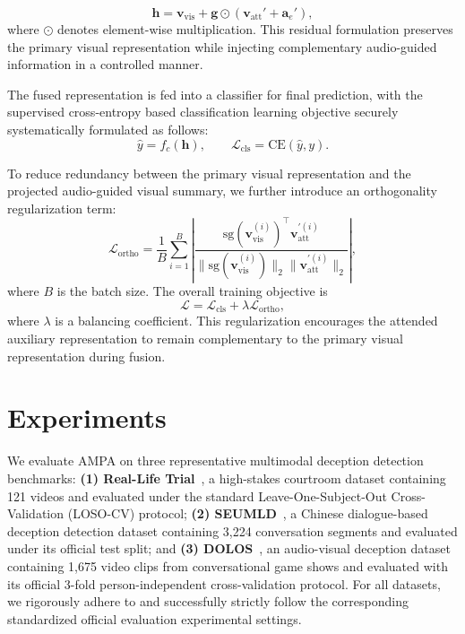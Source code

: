 \documentclass[sigconf,screen,review,anonymous]{acmart}
\begin{document}
\begin{equation}
\mathbf{h}
=
\mathbf{v}_{\mathrm{vis}}
+
\mathbf{g}\odot
\left(
\mathbf{v}_{\mathrm{att}}'
+
\mathbf{a}_e'
\right),
\end{equation}
where $\odot$ denotes element-wise multiplication. This residual formulation preserves the primary visual representation while injecting complementary audio-guided information in a controlled manner.

The fused representation is fed into a classifier for final prediction, with the supervised cross-entropy based classification learning objective securely systematically formulated as follows:
\begin{equation}
\hat{y} = f_c(\mathbf{h}), \qquad
\mathcal{L}_{\mathrm{cls}} = \mathrm{CE}(\hat{y}, y).
\end{equation}

To reduce redundancy between the primary visual representation and the projected audio-guided visual summary, we further introduce an orthogonality regularization term:
\begin{equation}
\mathcal{L}_{\mathrm{ortho}}
=
\frac{1}{B}
\sum_{i=1}^{B}
\left|
\frac{
\mathrm{sg}(\mathbf{v}_{\mathrm{vis}}^{(i)})^{\top}\mathbf{v}_{\mathrm{att}}^{\prime(i)}
}{
\|\mathrm{sg}(\mathbf{v}_{\mathrm{vis}}^{(i)})\|_2
\|\mathbf{v}_{\mathrm{att}}^{\prime(i)}\|_2
}
\right|,
\end{equation}
where $B$ is the batch size. The overall training objective is
\begin{equation}
\mathcal{L} = \mathcal{L}_{\mathrm{cls}} + \lambda \mathcal{L}_{\mathrm{ortho}},
\end{equation}
where $\lambda$ is a balancing coefficient. This regularization encourages the attended auxiliary representation to remain complementary to the primary visual representation during fusion.



\section{Experiments}
\label{sec:experiments}

We evaluate AMPA on three representative multimodal deception detection benchmarks: \textbf{(1) Real-Life Trial}~\cite{perez2015deception}, a high-stakes courtroom dataset containing 121 videos and evaluated under the standard Leave-One-Subject-Out Cross-Validation (LOSO-CV) protocol; \textbf{(2) SEUMLD}~\cite{xu2024multimodal}, a Chinese dialogue-based deception detection dataset containing 3,224 conversation segments and evaluated under its official test split; and \textbf{(3) DOLOS}~\cite{guo2023audio}, an audio-visual deception dataset containing 1,675 video clips from conversational game shows and evaluated with its official 3-fold person-independent cross-validation protocol. For all datasets, we rigorously adhere to and successfully strictly follow the corresponding standardized official evaluation experimental settings.
\end{document}
